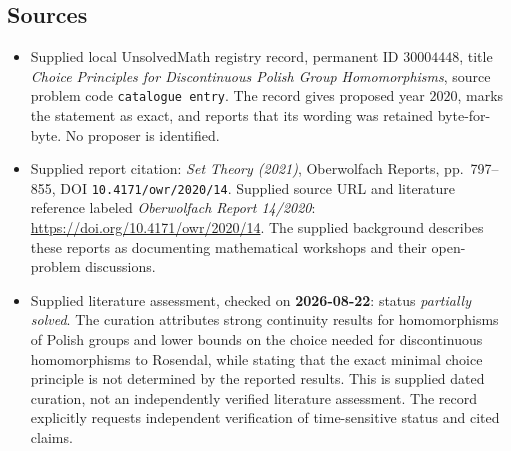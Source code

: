 \documentclass[11pt]{article}
\begin{document}
\subsection{Sources}
\begin{itemize}
\item Supplied local UnsolvedMath registry record, permanent ID \(30004448\), title \emph{Choice Principles for Discontinuous Polish Group Homomorphisms}, source problem code \texttt{catalogue entry}. The record gives proposed year \(2020\), marks the statement as exact, and reports that its wording was retained byte-for-byte. No proposer is identified.
\item Supplied report citation: \emph{Set Theory (2021)}, Oberwolfach Reports, pp.\ 797--855, DOI \texttt{10.4171/owr/2020/14}. Supplied source URL and literature reference labeled \emph{Oberwolfach Report 14/2020}: \url{https://doi.org/10.4171/owr/2020/14}. The supplied background describes these reports as documenting mathematical workshops and their open-problem discussions.
\item Supplied literature assessment, checked on \textbf{2026-08-22}: status \emph{partially solved}. The curation attributes strong continuity results for homomorphisms of Polish groups and lower bounds on the choice needed for discontinuous homomorphisms to Rosendal, while stating that the exact minimal choice principle is not determined by the reported results. This is supplied dated curation, not an independently verified literature assessment. The record explicitly requests independent verification of time-sensitive status and cited claims.
\end{itemize}
\end{document}
